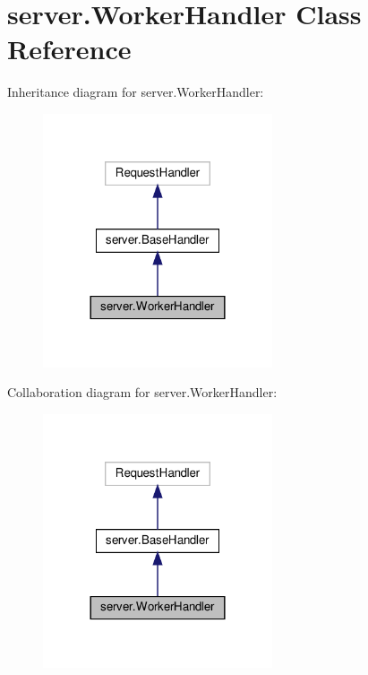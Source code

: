 \hypertarget{classserver_1_1WorkerHandler}{}\section{server.\+Worker\+Handler Class Reference}
\label{classserver_1_1WorkerHandler}


Inheritance diagram for server.\+Worker\+Handler\+:
\nopagebreak
\begin{figure}[H]
\begin{center}
\leavevmode
\includegraphics[width=192pt]{classserver_1_1WorkerHandler__inherit__graph}
\end{center}
\end{figure}


Collaboration diagram for server.\+Worker\+Handler\+:
\nopagebreak
\begin{figure}[H]
\begin{center}
\leavevmode
\includegraphics[width=192pt]{classserver_1_1WorkerHandler__coll__graph}
\end{center}
\end{figure}
